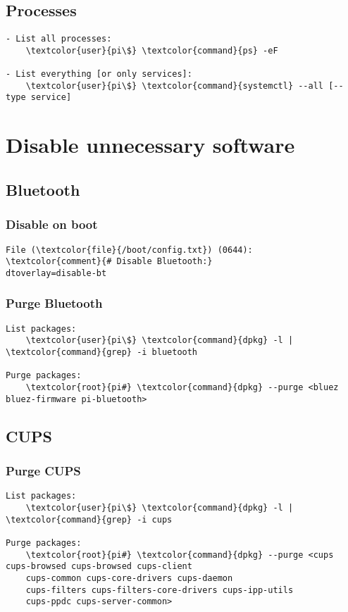 \documentclass[10pt, a4paper, onecolumn, openany]{book} %
\begin{document}
\subsection{Processes}
\begin{Verbatim}[commandchars=\\\{\}]
- List all processes:
    \textcolor{user}{pi\$} \textcolor{command}{ps} -eF
    
- List everything [or only services]:
    \textcolor{user}{pi\$} \textcolor{command}{systemctl} --all [--type service]
\end{Verbatim}



\section{Disable unnecessary software}
\subsection{Bluetooth}
\subsubsection{Disable on boot}
\begin{Verbatim}[commandchars=\\\{\}]
File (\textcolor{file}{/boot/config.txt}) (0644):
\textcolor{comment}{# Disable Bluetooth:}
dtoverlay=disable-bt
\end{Verbatim}
\subsubsection{Purge Bluetooth}
\begin{Verbatim}[commandchars=\\\{\}]
List packages:
    \textcolor{user}{pi\$} \textcolor{command}{dpkg} -l | \textcolor{command}{grep} -i bluetooth

Purge packages:
    \textcolor{root}{pi#} \textcolor{command}{dpkg} --purge <bluez bluez-firmware pi-bluetooth>
\end{Verbatim}
\subsection{CUPS}
\subsubsection{Purge CUPS}
\begin{Verbatim}[commandchars=\\\{\}]
List packages:
    \textcolor{user}{pi\$} \textcolor{command}{dpkg} -l | \textcolor{command}{grep} -i cups

Purge packages:
    \textcolor{root}{pi#} \textcolor{command}{dpkg} --purge <cups cups-browsed cups-browsed cups-client 
    cups-common cups-core-drivers cups-daemon 
    cups-filters cups-filters-core-drivers cups-ipp-utils 
    cups-ppdc cups-server-common>
\end{Verbatim}
\end{document}

